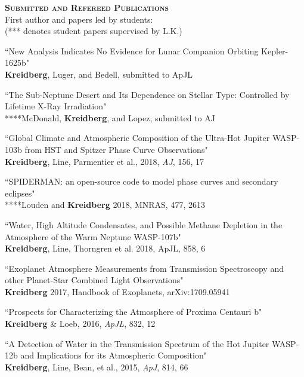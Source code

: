\documentclass[12pt,letterpaper]{article}
\begin{document}
\textbf{\textsc{Submitted and Refereed Publications}} \\
\vspace{1mm}
\hspace*{5mm}First author and papers led by students: \\
\hspace*{5mm}(*** denotes student papers supervised by L.K.)
\begin{compactenum}
\item ``New Analysis Indicates No Evidence for Lunar Companion Orbiting Kepler-1625b"\\
\textbf{Kreidberg}, Luger, and Bedell, submitted to ApJL

\item``The Sub-Neptune Desert and Its Dependence on Stellar Type: Controlled by Lifetime X-Ray Irradiation"\\
****McDonald, \textbf{Kreidberg}, and Lopez, submitted to AJ 

\item ``Global Climate and Atmospheric Composition of the Ultra-Hot Jupiter WASP-103b from HST and Spitzer Phase Curve Observations"\\
\textbf{Kreidberg}, Line, Parmentier et al., 2018, \textit{AJ}, 156, 17

\item ``SPIDERMAN: an open-source code to model phase curves and secondary eclipses"\\
****Louden and \textbf{Kreidberg} 2018, MNRAS, 477, 2613 

\item ``Water, High Altitude Condensates, and Possible Methane Depletion in the Atmosphere of the Warm Neptune WASP-107b"\\
\textbf{Kreidberg}, Line, Thorngren et al. 2018, ApJL, 858, 6 

\item ``Exoplanet Atmosphere Measurements from Transmission Spectroscopy and other Planet-Star Combined Light Observations"\\
\textbf{Kreidberg} 2017, Handbook of Exoplanets,  arXiv:1709.05941

\item ``Prospects for Characterizing the Atmosphere of Proxima Centauri b"\\
\textbf{Kreidberg} \& Loeb, 2016, \textit{ApJL}, 832, 12 

\item ``A Detection of Water in the Transmission Spectrum of the Hot Jupiter WASP-12b and Implications for its Atmospheric Composition"\\
\textbf{Kreidberg}, Line,  Bean, et al., 2015, \textit{ApJ}, 814, 66


\end{compactenum}
\end{document}
